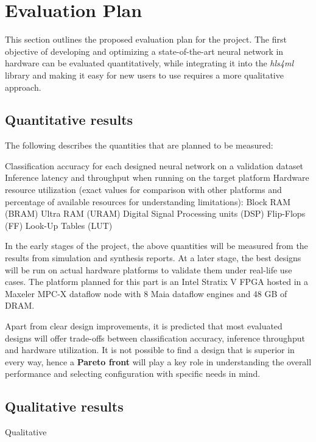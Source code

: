 \chapter{Evaluation Plan}

This section outlines the proposed evaluation plan for the project. The first objective of developing and optimizing a state-of-the-art neural network in hardware can be evaluated quantitatively, while integrating it into the \textit{hls4ml} library and making it easy for new users to use requires a more qualitative approach.

\section{Quantitative results}
The following describes the quantities that are planned to be measured:

\begin{outline}
  \1 Classification accuracy for each designed neural network on a validation dataset
  \1 Inference latency and throughput when running on the target platform
  \1 Hardware resource utilization (exact values for comparison with other platforms and percentage of available resources for understanding limitations):
    \2 Block RAM (BRAM)
    \2 Ultra RAM (URAM)
    \2 Digital Signal Processing units (DSP)
    \2 Flip-Flops (FF)
    \2 Look-Up Tables (LUT)
\end{outline}

In the early stages of the project, the above quantities will be measured from the results from simulation and synthesis reports. At a later stage, the best designs will be run on actual hardware platforms to validate them under real-life use cases. The platform planned for this part is an Intel Stratix V FPGA hosted in a Maxeler MPC-X dataflow node with 8 Maia dataflow engines and 48 GB of DRAM.

Apart from clear design improvements, it is predicted that most evaluated designs will offer trade-offs between classification accuracy, inference throughput and hardware utilization. It is not possible to find a design that is superior in every way, hence a \textbf{Pareto front} will play a key role in understanding the overall performance and selecting configuration with specific needs in mind.

\section{Qualitative results}
Qualitative
